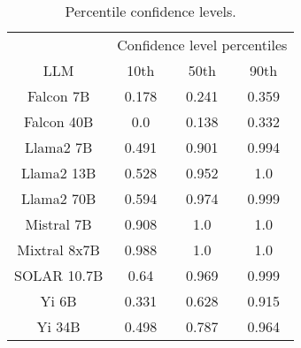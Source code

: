 \begin{table*}
\centering
\begin{tabular}{c|c|c|c}
& \multicolumn{3}{c}{Confidence level percentiles} \\ 
LLM & 10th & 50th & 90th\\ \hline
Falcon 7B & 0.178 & 0.241 & 0.359\\
Falcon 40B & 0.0 & 0.138 & 0.332\\
Llama2 7B & 0.491 & 0.901 & 0.994\\
Llama2 13B & 0.528 & 0.952 & 1.0\\
Llama2 70B & 0.594 & 0.974 & 0.999\\
Mistral 7B & 0.908 & 1.0 & 1.0\\
Mixtral 8x7B & 0.988 & 1.0 & 1.0\\
SOLAR 10.7B & 0.64 & 0.969 & 0.999\\
Yi 6B & 0.331 & 0.628 & 0.915\\
Yi 34B & 0.498 & 0.787 & 0.964\\
\hline
\end{tabular}
\caption{Percentile confidence levels.}
\label{tab:percentile_conf}
\end{table*}
